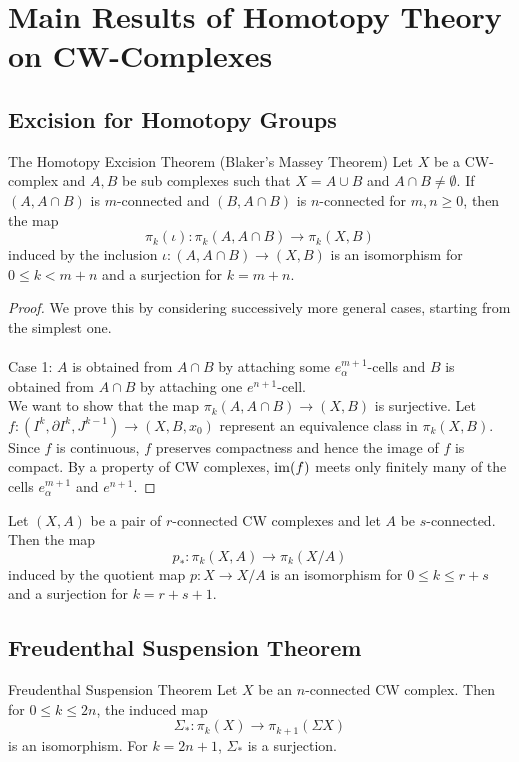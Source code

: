 \documentclass[a4paper]{article}
\begin{document}
\pagebreak

\section{Main Results of Homotopy Theory on CW-Complexes}
\subsection{Excision for Homotopy Groups}
\begin{thm}{The Homotopy Excision Theorem (Blaker's Massey Theorem)}{} Let $X$ be a CW-complex and $A,B$ be sub complexes such that $X=A\cup B$ and $A\cap B\neq\emptyset$. If $(A,A\cap B)$ is $m$-connected and $(B,A\cap B)$ is $n$-connected for $m,n\geq 0$, then the map $$\pi_k(\iota):\pi_k(A,A\cap B)\to\pi_k(X,B)$$ induced by the inclusion $\iota:(A,A\cap B)\to(X,B)$ is an isomorphism for $0\leq k<m+n$ and a surjection for $k=m+n$. \tcbline
\begin{proof}
We prove this by considering successively more general cases, starting from the simplest one. \\~\\

Case 1: $A$ is obtained from $A\cap B$ by attaching some $e_\alpha^{m+1}$-cells and $B$ is obtained from $A\cap B$ by attaching one $e^{n+1}$-cell. \\
We want to show that the map $\pi_k(A,A\cap B)\to(X,B)$ is surjective. Let $f:(I^k,\partial I^k,J^{k-1})\to(X,B,x_0)$ represent an equivalence class in $\pi_k(X,B)$. Since $f$ is continuous, $f$ preserves compactness and hence the image of $f$ is compact. By a property of CW complexes, $\operatorname{im}(f)$ meets only finitely many of the cells $e_\alpha^{m+1}$ and $e^{n+1}$. 
\end{proof}
\end{thm}

\begin{prp}{}{} Let $(X,A)$ be a pair of $r$-connected CW complexes and let $A$ be $s$-connected. Then the map $$p_\ast:\pi_k(X,A)\to\pi_k(X/A)$$ induced by the quotient map $p:X\to X/A$ is an isomorphism for $0\leq k\leq r+s$ and a surjection for $k=r+s+1$. 
\end{prp}

\subsection{Freudenthal Suspension Theorem}
\begin{thm}{Freudenthal Suspension Theorem}{} Let $X$ be an $n$-connected CW complex. Then for $0\leq k\leq 2n$, the induced map $$\Sigma_\ast:\pi_k(X)\to\pi_{k+1}(\Sigma X)$$ is an isomorphism. For $k=2n+1$, $\Sigma_\ast$ is a surjection. 
\end{thm}
\end{document}
